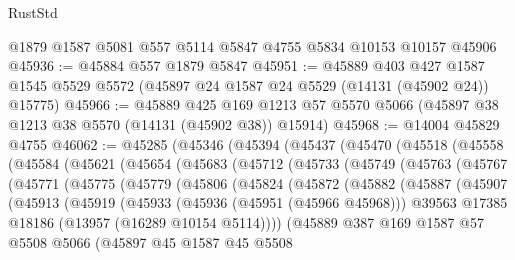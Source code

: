 \begin{lexlean}{RustStd}
\begin{coremodule}
    @1879
    @1587
    @5081
    @557
    @5114
    @5847
    @4755
    @5834
    @10153
    @10157
    @45906
@45936 := @45884 @557 @1879 @5847
@45951 := @45889
    @403
    @427
    @1587
    @1545
    @5529
    @5572
    (@45897 @24 @1587 @24 @5529 (@14131 (@45902 @24)) @15775)
@45966 := @45889
    @425
    @169
    @1213
    @57
    @5570
    @5066
    (@45897 @38 @1213 @38 @5570 (@14131 (@45902 @38)) @15914)
@45968 := @14004 @45829 @4755
@46062 := @45285
    (@45346
      (@45394
        (@45437
          (@45470
            (@45518
              (@45558
                (@45584
                  (@45621
                    (@45654
                      (@45683
                        (@45712
                          (@45733
                            (@45749
                              (@45763
                                (@45767
                                  (@45771
                                    (@45775
                                      (@45779
                                        (@45806
                                          (@45824
                                            (@45872
                                              (@45882
                                                (@45887
                                                  (@45907
                                                    (@45913
                                                      (@45919
                                                        (@45933
                                                          (@45936 (@45951 (@45966 @45968)))
                                                          @39563
                                                          @17385
                                                          @18186
                                                          (@13957 (@16289 @10154 @5114))))
                                                      (@45889
                                                        @387
                                                        @169
                                                        @1587
                                                        @57
                                                        @5508
                                                        @5066
                                                        (@45897
                                                          @45
                                                          @1587
                                                          @45
                                                          @5508

\end{coremodule}
\end{lexlean}
